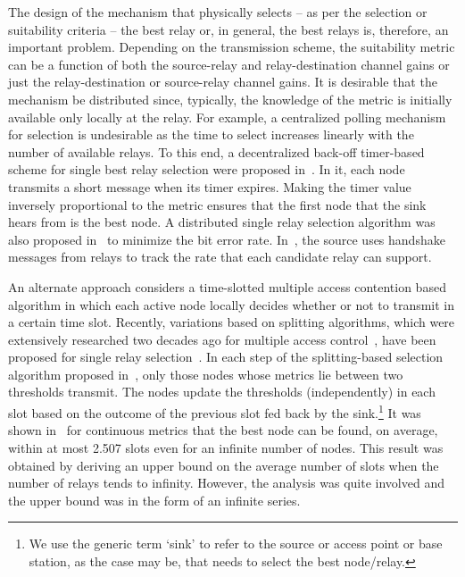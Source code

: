 \documentclass[12pt,draftcls,peerreview, onecolumn]{IEEEtran}
\begin{document}
The design of the mechanism that physically selects -- as per the
selection or suitability criteria -- the best relay or, in general,
the  best relays is, therefore, an important problem. Depending on
the transmission scheme, the suitability metric can be a function of
both the source-relay and relay-destination channel gains or just the
relay-destination or source-relay channel gains. It is desirable that
the mechanism be distributed since, typically, the knowledge of the
metric is initially available only locally at the relay.  For example,
a centralized polling mechanism for selection is undesirable as the
time to select increases linearly with the number of available relays.
To this end, a decentralized back-off timer-based scheme for single
best relay selection were proposed in~\cite{bletsas_jsac_2006}. In it,
each node transmits a short message when its timer expires. Making the
timer value inversely proportional to the metric ensures that the
first node that the sink hears from is the best node.  A distributed
single relay selection algorithm was also proposed
in~\cite{krikidis_CL_2007} to minimize the bit error rate.
In~\cite{liu_2006_TWC}, the source uses handshake messages from relays
to track the rate that each candidate relay can support.



An alternate approach considers a time-slotted multiple access
contention based algorithm in which each active node locally decides
whether or not to transmit in a certain time slot.  Recently,
variations based on splitting algorithms, which were extensively
researched two decades ago for multiple access control~\cite[Chp.\ 
4]{bertsekas_gallager}, have been proposed for single relay
selection~\cite{qin_infocomm_2004,yim_TWC_2009_VPMAS}. In each step of
the splitting-based selection algorithm proposed
in~\cite{qin_infocomm_2004}, only those nodes whose metrics lie
between two thresholds transmit. The nodes update the thresholds
(independently) in each slot based on the outcome of the previous slot
fed back by the sink.\footnote{We use the generic term `sink' to refer
  to the source or access point or base station, as the case may be,
  that needs to select the best node/relay.} It was shown
in~\cite{qin_infocomm_2004} for continuous metrics that the best node
can be found, on average, within at most 2.507 slots even for an
infinite number of nodes.  This result was obtained by deriving an
upper bound on the average number of slots when the number of relays
tends to infinity. However, the analysis was quite involved and the
upper bound was in the form of an infinite series.
\end{document}
